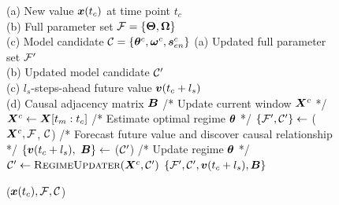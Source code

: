 \begin{figure}[!h]
\vspace{-5.0ex}
\begin{algorithm}[H]
    \normalsize
    \caption{\method($\bm{x}(t_c), \mathcal{F}, \mathcal{C}$)}
    \label{alg:model}
    \begin{algorithmic}[1]
        \hspace{0mm}    (a) New value $\bm{x}(t_c)$ at time point $t_c$ \\
        \hspace{9.5mm} (b) Full parameter set $\mathcal{F} = \{\boldsymbol{\Theta}, \boldsymbol{\Omega}\}$ \\
        \hspace{9.68mm} (c) Model candidate $\mathcal{C} = \{\boldsymbol{\theta}^c, \boldsymbol{\omega}^c, \bm{s}^c_{en}\}$
        \hspace{0mm}    (a) Updated full parameter set $\mathcal{F}'$ \\
        \hspace{11.8mm} (b) Updated model candidate $\mathcal{C}'$ \\
        \hspace{11.9mm} (c) $l_s$-steps-ahead future value $\bm{v}(t_c+l_s)$ \\
        \hspace{11.8mm} (d) Causal adjacency matrix $\bm{B}$
        \STATE /* Update current window $\bm{X}^c$ */
        \STATE $\bm{X}^c \leftarrow \bm{X}[t_m : t_c]$
        \STATE /* Estimate optimal regime $\boldsymbol{\theta}$ */
        \STATE $\{\mathcal{F}', \mathcal{C}'\} \leftarrow$ \modelestimator($\bm{X}^c, \mathcal{F}$, $\mathcal{C}$)
        \STATE /* Forecast future value and discover causal relationship */
        \STATE $\{\bm{v}(t_c+l_s),~\bm{B}\} \leftarrow$ \modelgenerator($\mathcal{C}'$)
        \STATE /* Update regime $\boldsymbol{\theta}$ */
            \STATE $\mathcal{C}' \leftarrow \textsc{RegimeUpdater}(\bm{X}^c, \mathcal{C}')$
        \ENDIF
    \RETURN $\{\mathcal{F}', \mathcal{C}', \bm{v}(t_c+l_s), \bm{B}\}$
    \end{algorithmic}
\end{algorithm}
\vspace{-4.5em}
\end{figure}